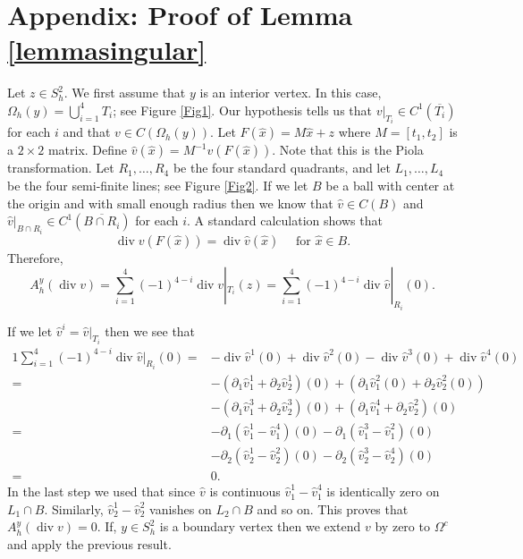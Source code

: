 \documentclass[11pt]{amsart}
\numberwithin{equation}{section}
\newcommand{\dive}{\operatorname{div}}
\theoremstyle{definition}
\begin{document}
\section{Appendix: Proof of Lemma \ref{lemmasingular}}
 
Let $z \in S_h^2$. 
We first assume that $y$ is an interior vertex.   
In this case,  $\Omega_h(y)= \bigcup_{i=1}^4 T_i$; see Figure \ref{Fig1}.    
Our hypothesis tells us that $v|_{T_i} \in C^1(\overline{T_i})$ for each $i$ and 
that $v \in C(\Omega_h(y))$. 
Let $F(\hat{x})=M \hat{x}+z$ where $M=[t_1, t_2]$ is a $2 \times 2$ matrix.  
Define $\hat{v}(\hat{x})= M^{-1} v(F(\hat{x}))$. 
Note that this is the Piola transformation.  
Let  $R_1, \ldots, R_4$  be the four standard quadrants, and let $L_1, \ldots, L_4$ 
be the four semi-finite lines; see Figure \ref{Fig2}. 
If we let $B$ be a ball with center at the origin and with small enough radius then we 
know that $\hat{v} \in C(B)$ and $\hat{v}|_{B \cap R_i} \in C^1(\overline{B \cap R_i})$ 
for each $i$.  A standard calculation shows that
\begin{equation*}
\dive v(F(\hat{x}))=\dive \hat{v}(\hat{x}) \quad \text{ for } \hat{x} \in  B.
\end{equation*}
Therefore,
\begin{equation*}
A_h^y(\dive  v)= \sum_{i=1}^4 (-1)^{4-i} \dive v|_{T_i}(z)=\sum_{i=1}^4 (-1)^{4-i} \dive \hat{v}|_{R_i}(0).
\end{equation*}

If we let $\hat{v}^i= \hat{v}|_{T_i}$ then we see that
\begin{alignat*}{1}
\sum_{i=1}^4 (-1)^{4-i} \dive \hat{v}|_{R_i}(0)= & -\dive \hat{v}^1(0)+\dive \hat{v}^2(0)-  \dive \hat{v}^3(0)+\dive \hat{v}^4(0)\\
= &-( \partial_1 \hat{v}_1^1+ \partial_2 \hat{v}_2^1)(0)+(\partial_1 \hat{v}_1^2(0) + \partial_2 \hat{v}_2^2(0)) \\
&-( \partial_1 \hat{v}_1^3+ \partial_2 \hat{v}_2^3)(0)+ (\partial_1 \hat{v}_1^4+ \partial_2 \hat{v}_2^2)(0)\\
=& -\partial_1( \hat{v}_1^1 -\hat{v}_1^4)(0)-\partial_1( \hat{v}_1^3 -\hat{v}_1^2)(0)\\
& -\partial_2 ( \hat{v}_2^1-  \hat{v}_2^2)(0)  -\partial_2 ( \hat{v}_2^3-  \hat{v}_2^4)(0) \\
=&0.
\end{alignat*}
In the last step we used that since $\hat{v}$ is continuous $\hat{v}_1^1 -\hat{v}_1^4$ is identically zero on $L_1 \cap B$. Similarly,    $\hat{v}_2^1 -\hat{v}_2^2$ vanishes on $L_2 \cap B$ and so on.
This proves that $A_h^y(\dive  v)=0$.  If, $y \in S_h^2$ is a boundary vertex then we extend $v$ by zero to $\Omega^c$ and apply the previous result. 
\end{document}
